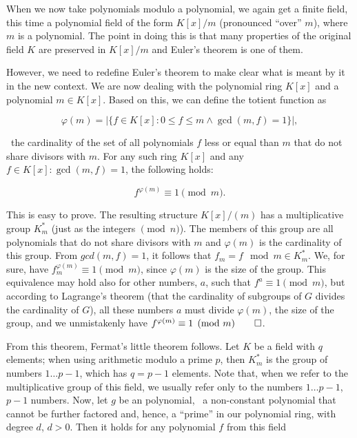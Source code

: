 \documentclass[tikz]{scrreprt}
\begin{document}
When we now take polynomials modulo a polynomial,
we again get a finite field, this time a polynomial field
of the form $K[x]/m$ (pronounced ``over'' $m$),
where $m$ is a polynomial.
The point in doing this is that many properties of
the original field $K$ are preserved in $K[x]/m$ and
Euler's theorem is one of them.

However, we need to redefine Euler's theorem
to make clear what is meant by it in the new context.
We are now dealing with the polynomial ring $K[x]$
and a polynomial $m \in K[x]$.
Based on this, we can define the totient function as

\[
\varphi(m) = |\lbrace f \in K[x] : 0 \le f \le m \wedge \gcd(m,f) = 1\rbrace|,
\]

\ie\ the cardinality of the set of all polynomials $f$
less or equal than $m$ that do not share
divisors with $m$. For any such ring $K[x]$
and any $f \in K[x] : \gcd(m,f) = 1$,
the following holds:

\begin{equation}
f^{\varphi(m)} \equiv 1 \pmod{m}.
\end{equation}

This is easy to prove.
The resulting structure $K[x]/(m)$
has a multiplicative
group $K_m^*$ (just as the integers $\pmod{n}$).
The members of this group are all polynomials
that do not share divisors with $m$ and $\varphi(m)$
is the cardinality of this group.
From $gcd(m,f) = 1$, it follows that
$f_m = f \mod{m} \in K_m^*$.
We, for sure, have 
$f_m^{\varphi(m)} \equiv 1 \pmod{m}$, since 
$\varphi(m)$ is the size of the group.
This equivalence may hold also for other numbers, $a$,
such that $f^a \equiv 1 \pmod{m}$, but
according to Lagrange's theorem 
(that the cardinality of subgroups of $G$ divides
the cardinality of $G$), all these numbers $a$
must divide $\varphi(m)$, the size of the group,
and we unmistakenly have
$f^{\varphi(m)} \equiv 1 \pmod{m}\qed$.

From this theorem, Fermat's little theorem
follows. Let $K$ be a field with $q$ elements; when using
arithmetic modulo a prime $p$, then $K_m^*$ is the group
of numbers $1\dots p-1$, which has $q=p-1$ elements.
Note that, when we refer to the multiplicative group
of this field, we usually refer only to the numbers
$1\dots p-1$, \ie\ $p-1$ numbers.
Now, let $g$ be an  polynomial,
\ie\ a non-constant polynomial that cannot be 
further factored and, hence, a ``prime'' in our polynomial ring,
with degree $d$, $d>0$. Then it holds for any polynomial $f$
from this field
\end{document}
